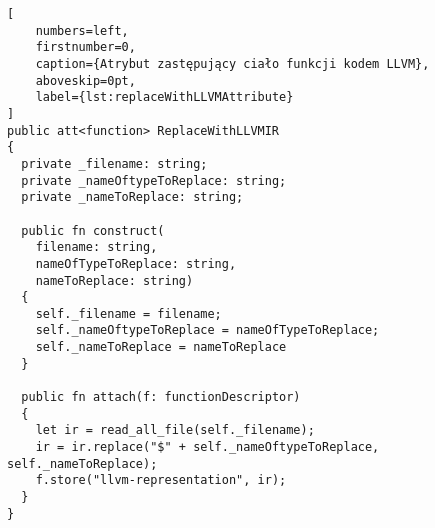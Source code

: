 \begin{lstlisting}[
    numbers=left,
    firstnumber=0,
    caption={Atrybut zastępujący ciało funkcji kodem LLVM},
    aboveskip=0pt,
    label={lst:replaceWithLLVMAttribute}
]
public att<function> ReplaceWithLLVMIR
{
  private _filename: string;
  private _nameOftypeToReplace: string;
  private _nameToReplace: string;

  public fn construct(
    filename: string,
    nameOfTypeToReplace: string,
    nameToReplace: string)
  {
    self._filename = filename;
    self._nameOftypeToReplace = nameOfTypeToReplace;
    self._nameToReplace = nameToReplace
  }

  public fn attach(f: functionDescriptor)
  {
    let ir = read_all_file(self._filename);
    ir = ir.replace("$" + self._nameOftypeToReplace, self._nameToReplace);
    f.store("llvm-representation", ir);
  }
}

\end{lstlisting}
